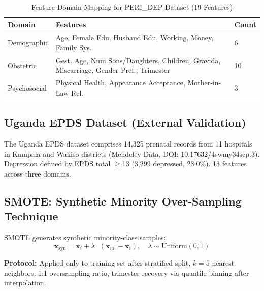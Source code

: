 \documentclass[12pt,a4paper]{article}
\begin{document}
\begin{table}[htbp]
\caption{Feature-Domain Mapping for PERI\_DEP Dataset (19 Features)}
\label{tab:features}
\centering
\begin{tabular}{lll}
\toprule
\textbf{Domain} & \textbf{Features} & \textbf{Count} \\
\midrule
Demographic & Age, Female Edu, Husband Edu, Working, Money, Family Sys. & 6 \\
Obstetric & Gest. Age, Num Sons/Daughters, Children, Gravida, Miscarriage, Gender Pref., Trimester & 10 \\
Psychosocial & Physical Health, Appearance Acceptance, Mother-in-Law Rel. & 3 \\
\bottomrule
\end{tabular}
\end{table}

\subsection{Uganda EPDS Dataset (External Validation)}

The Uganda EPDS dataset\cite{nakalema2022} comprises 14,325 prenatal records from 11 hospitals in Kampala and Wakiso districts (Mendeley Data, DOI: 10.17632/4swmy34scp.3). Depression defined by EPDS total $\geq$13 (3,299 depressed, 23.0\%). 13 features across three domains.

\subsection{SMOTE: Synthetic Minority Over-Sampling Technique}

SMOTE\cite{chawla2002} generates synthetic minority-class samples:
\begin{equation}
\mathbf{x}_{\text{syn}} = \mathbf{x}_i + \lambda \cdot (\mathbf{x}_{nn} - \mathbf{x}_i), \quad \lambda \sim \text{Uniform}(0, 1)
\end{equation}

\textbf{Protocol:} Applied only to training set after stratified split, $k=5$ nearest neighbors, 1:1 oversampling ratio, trimester recovery via quantile binning after interpolation.
\end{document}
